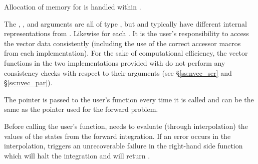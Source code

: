{
  Allocation of memory for  is handled within {\cvodes}.

  The , , and  arguments are all of type , 
  but  and  typically have different internal representations 
  from .  Likewise for each .  It is the user's 
  responsibility to access the vector data consistently (including the use of the 
  correct accessor macros from each {\nvector} implementation). For the sake of 
  computational efficiency, the vector functions in the two {\nvector} implementations 
  provided with {\cvodes} do not perform any consistency checks with respect to their 
   arguments (see \S\ref{ss:nvec_ser} and \S\ref{ss:nvec_par}).

  The  pointer is passed to 
  the user's  function every time it is called and can be the same as the 
   pointer used for the forward problem.

  {\warn}Before calling the user's  function, {\cvodes} needs to evaluate
  (through interpolation) the values of the states from the forward integration. 
  If an error occurs in the interpolation, {\cvodes} triggers an unrecoverable
  failure in the right-hand side function which will halt the integration and
   will return .
}


